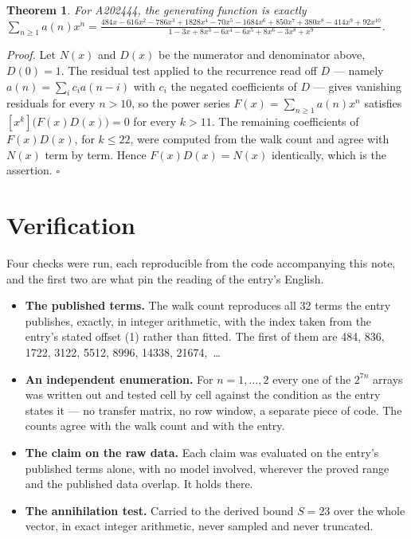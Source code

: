 \documentclass[11pt]{article}
\newtheorem{theorem}{Theorem}
\theoremstyle{definition}
\begin{document}
\begin{theorem} For A202444, the generating function is exactly $\sum_{n\ge 1} a(n)x^n = \frac{484x - 616x^{2} - 786x^{3} + 1828x^{4} - 70x^{5} - 1684x^{6} + 850x^{7} + 380x^{8} - 414x^{9} + 92x^{10}}{1 - 3x + 8x^{3} - 6x^{4} - 6x^{5} + 8x^{6} - 3x^{8} + x^{9}}$.\end{theorem}

{\itshape Proof.} Let $N(x)$ and $D(x)$ be the numerator and denominator above, $D(0)=1$. The residual test applied to the recurrence read off $D$ --- namely $a(n) = \sum_i c_i a(n-i)$ with $c_i$ the negated coefficients of $D$ --- gives vanishing residuals for every $n > 10$, so the power series $F(x)=\sum_{n\ge 1}a(n)x^n$ satisfies $[x^k]\bigl(F(x)D(x)\bigr) = 0$ for every $k > 11$. The remaining coefficients of $F(x)D(x)$, for $k \le 22$, were computed from the walk count and agree with $N(x)$ term by term. Hence $F(x)D(x) = N(x)$ identically, which is the assertion. $\square$

\section{Verification}

Four checks were run, each reproducible from the code accompanying this note, and the first two are what pin the reading of the entry's English.

\begin{itemize}

\item {\bfseries The published terms.} The walk count reproduces all 32 terms the entry publishes, exactly, in integer arithmetic, with the index taken from the entry's stated offset (1) rather than fitted. The first of them are 484, 836, 1722, 3122, 5512, 8996, 14338, 21674,~\dots

\item {\bfseries An independent enumeration.} For $n = 1,\dots,2$ every one of the $2^{7n}$ arrays was written out and tested cell by cell against the condition as the entry states it --- no transfer matrix, no row window, a separate piece of code. The counts agree with the walk count and with the entry.

\item {\bfseries The claim on the raw data.} Each claim was evaluated on the entry's published terms alone, with no model involved, wherever the proved range and the published data overlap. It holds there.

\item {\bfseries The annihilation test.} Carried to the derived bound $S = 23$ over the whole vector, in exact integer arithmetic, never sampled and never truncated.

\end{itemize}
\end{document}
